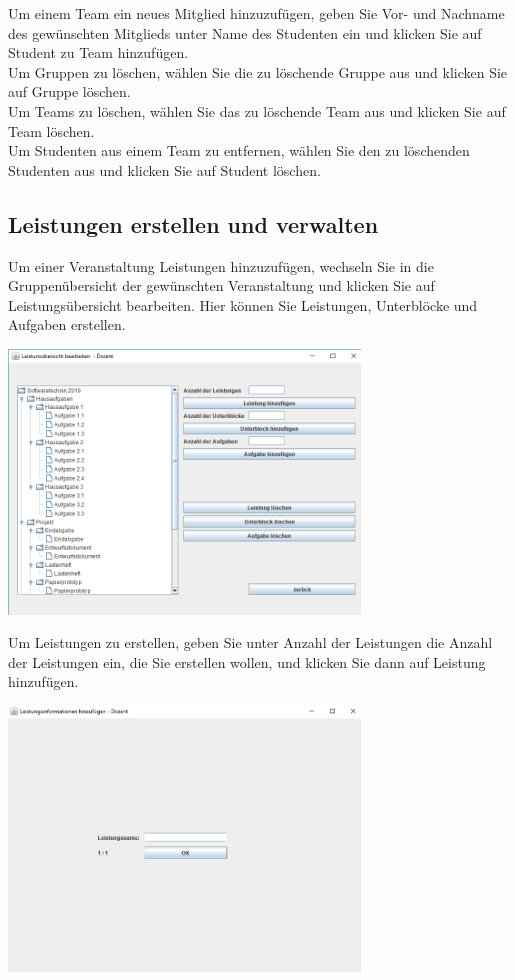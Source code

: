 \documentclass{Handbuch}
\begin{document}
Um einem Team ein neues Mitglied hinzuzufügen, geben Sie Vor- und Nachname des gewünschten Mitglieds unter \glqq Name des Studenten\grqq{} ein und klicken Sie auf \frqq Student zu Team hinzufügen\flqq.\\
Um Gruppen zu löschen, wählen Sie die zu löschende Gruppe aus und klicken Sie auf \frqq Gruppe löschen\flqq.\\
Um Teams zu löschen, wählen Sie das zu löschende Team aus und klicken Sie auf \frqq Team löschen\flqq.\\
Um Studenten aus einem Team zu entfernen, wählen Sie den zu löschenden Studenten aus und klicken Sie auf \frqq Student löschen\flqq.\\

\subsection{Leistungen erstellen und verwalten}
Um einer Veranstaltung Leistungen hinzuzufügen, wechseln Sie in die Gruppenübersicht der gewünschten Veranstaltung und klicken Sie auf \frqq Leistungsübersicht bearbeiten\flqq. Hier können Sie Leistungen, Unterblöcke und Aufgaben erstellen.
\begin{center}
	\includegraphics[width=0.7\textwidth]{img_DozentenGUI_15.png}
\end{center}
Um Leistungen zu erstellen, geben Sie unter \glqq Anzahl der Leistungen\grqq{} die Anzahl der Leistungen ein, die Sie erstellen wollen, und klicken Sie dann auf \frqq Leistung hinzufügen\flqq. 
\begin{center}
	\includegraphics[width=0.7\textwidth]{img_DozentenGUI_16.png}
\end{center}
\end{document}
